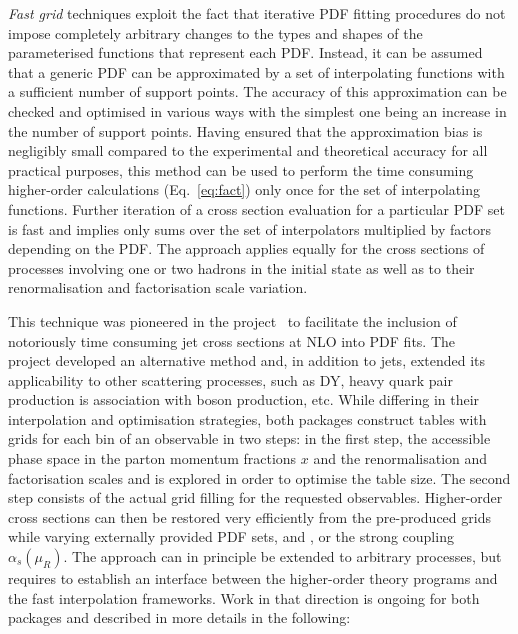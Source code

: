   \emph{Fast grid} techniques exploit the fact that iterative PDF fitting
  procedures do not impose completely arbitrary changes to the types
  and shapes of the parameterised functions that represent each PDF\@.
  Instead, it can be assumed that a generic PDF can be approximated by
  a set of interpolating functions with a sufficient number of
support points. The 
  accuracy of this approximation can be checked and optimised 
  in various ways with the simplest one being an increase in the number of
  support points. Having ensured that the approximation bias
  is negligibly
  small compared to the experimental and theoretical accuracy 
  for all practical purposes, this method can be used to perform
  the time consuming higher-order calculations (Eq.~\ref{eq:fact})
  only once for the set of interpolating functions. 
  Further iteration of a cross section evaluation for
  a particular PDF set is fast and implies only sums over
  the set of interpolators multiplied by factors depending on the
  PDF\@. The approach applies equally 
  for the cross sections of
  processes involving one or two hadrons in the initial state as well
  as to their renormalisation and factorisation scale variation.

  This technique was pioneered in the \fastnlo
  project~\cite{Kluge:2006xs} to facilitate the inclusion of
  notoriously time consuming jet cross sections at NLO into PDF fits.
  The \applgrid~\cite{Carli:2010rw} project developed an alternative method
  and, in addition to jets, extended its applicability to other scattering processes, 
  such as DY, heavy quark pair production is association with boson production, etc.
  While differing in their interpolation
  and optimisation strategies, both packages construct tables with
  grids for each bin of an observable in two steps: in the first step,
  the accessible phase space in the parton momentum fractions $x$ and
  the renormalisation and factorisation scales \mur and \muf is
  explored in order to optimise the table size. The second step
  consists of the actual grid filling for the
  requested observables. Higher-order cross sections can then be
  restored very efficiently from the pre-produced grids while varying
  externally provided PDF sets, \mur and \muf, or the strong coupling
  $\alpha_s(\mu_R)$. The approach can in principle be extended to arbitrary
  processes, but requires to establish an interface between the
  higher-order theory programs and the fast interpolation
  frameworks. Work in that direction is ongoing for both packages
  and described in more details in the following:

